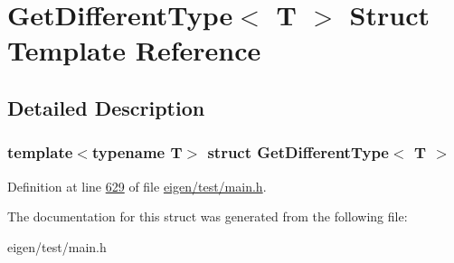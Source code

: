 \hypertarget{struct_get_different_type}{}\section{Get\+Different\+Type$<$ T $>$ Struct Template Reference}
\label{struct_get_different_type}


\subsection{Detailed Description}
\subsubsection*{template$<$typename T$>$\newline
struct Get\+Different\+Type$<$ T $>$}



Definition at line \hyperlink{eigen_2test_2main_8h_source_l00629}{629} of file \hyperlink{eigen_2test_2main_8h_source}{eigen/test/main.\+h}.



The documentation for this struct was generated from the following file\+:\begin{DoxyCompactItemize}
\item 
eigen/test/main.\+h\end{DoxyCompactItemize}
